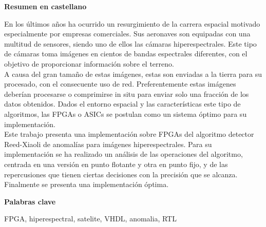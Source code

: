 
\newpage

\thispagestyle{empty}

\begin{center}

{\bf \Huge Resumen en castellano}

  \end{center}
\vspace{1cm}

En los últimos años ha ocurrido un resurgimiento de la carrera espacial motivado especialmente por empresas comerciales. Sus aeronaves son equipadas con una multitud de sensores, siendo uno de ellos las cámaras hiperespectrales. Este tipo de cámaras toma imágenes en cientos de bandas espectrales diferentes, con el objetivo de proporcionar información sobre el terreno.
\\
A causa del gran tamaño de estas imágenes, estas son enviadas a la tierra para su procesado, con el consecuente uso de red. Preferentemente estas imágenes deberían procesarse o comprimirse in  situ para enviar solo una fracción de los datos obtenidos. Dados el entorno espacial y las características este tipo de algoritmos, las FPGAs o ASICs se postulan como un sistema óptimo para su implementación.
\\
Este trabajo presenta una implementación sobre FPGAs del algoritmo detector Reed-Xiaoli de anomalías para imágenes hiperespectrales. Para su implementación se ha realizado un análisis de las operaciones del algoritmo, centrada en una versión en punto flotante y otra en punto fijo, y de las repercusiones que tienen ciertas decisiones con la precisión que se alcanza.
\\Finalmente se presenta una implementación óptima.



\vspace{1cm}


\begin{center}

{\bf \Large Palabras clave}

   \end{center}

   \vspace{0.5cm}
   
   FPGA, hiperespectral, satelite, VHDL, anomalia, RTL
   


